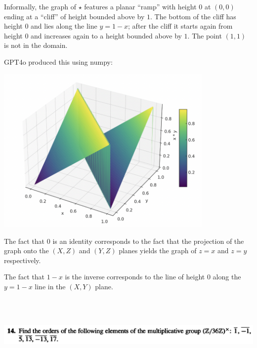 \begin{remark*}
  Informally, the graph of $\star$ features a planar ``ramp​'' with height $0$ at $(0, 0)$ ending at
  a ``cliff​'' of height bounded above by $1$. The bottom of the cliff has height $0$ and lies along
  the line $y = 1 - x$; after the cliff it starts again from height 0 and increases again to a
  height bounded above by $1$. The point $(1, 1)$ is not in the domain.

  GPT4o produced this using numpy:
  \begin{mdframed}
\includegraphics[width=300pt]{img/algebra--nf--1-6afd.png}
\end{mdframed}
  The fact that $0$ is an identity corresponds to the fact that the projection of the graph onto
  the $(X, Z)$ and $(Y, Z)$ planes yields the graph of $z = x$ and $z = y$ respectively.

  The fact that $1 - x$ is the inverse corresponds to the line of height $0$ along the $y = 1 - x$
  line in the $(X, Y)$ plane.
\end{remark*}




~\\~\\
\begin{mdframed}
\includegraphics[width=400pt]{img/algebra--nf--1--problem-set-1-5539.png}
\end{mdframed}

